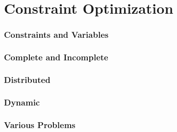 \chapter{Constraint Optimization}
\subsection{Constraints and Variables}
\subsection{Complete and Incomplete}
\subsection{Distributed}
\subsection{Dynamic}
\subsection{Various Problems}
